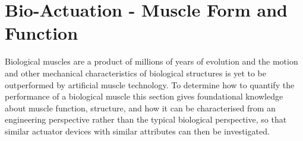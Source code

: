 %
%


\section{Bio-Actuation - Muscle Form and Function}

Biological muscles are a product of millions of years of evolution and the motion and other mechanical characteristics of biological structures is yet to be outperformed by artificial muscle technology. To determine how to quantify the performance of a biological muscle this section gives foundational knowledge about muscle function, structure, and how it can be characterised from an engineering perspective rather than the typical biological perspective, so that similar actuator devices with similar attributes can then be investigated.

